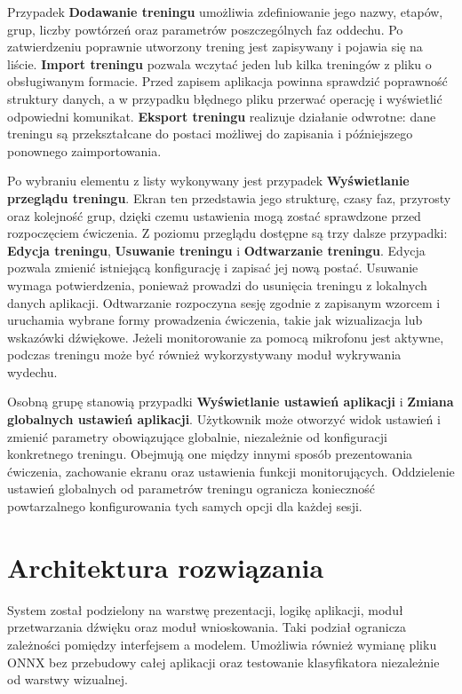 \newpage

Przypadek \textbf{Dodawanie treningu} umożliwia zdefiniowanie jego nazwy, etapów, grup, liczby powtórzeń oraz parametrów poszczególnych faz oddechu. Po zatwierdzeniu poprawnie utworzony trening jest zapisywany i pojawia się na liście. \textbf{Import treningu} pozwala wczytać jeden lub kilka treningów z pliku o obsługiwanym formacie. Przed zapisem aplikacja powinna sprawdzić poprawność struktury danych, a w przypadku błędnego pliku przerwać operację i wyświetlić odpowiedni komunikat. \textbf{Eksport treningu} realizuje działanie odwrotne: dane treningu są przekształcane do postaci możliwej do zapisania i późniejszego ponownego zaimportowania.

Po wybraniu elementu z listy wykonywany jest przypadek \textbf{Wyświetlanie przeglądu treningu}. Ekran ten przedstawia jego strukturę, czasy faz, przyrosty oraz kolejność grup, dzięki czemu ustawienia mogą zostać sprawdzone przed rozpoczęciem ćwiczenia. Z poziomu przeglądu dostępne są trzy dalsze przypadki: \textbf{Edycja treningu}, \textbf{Usuwanie treningu} i \textbf{Odtwarzanie treningu}. Edycja pozwala zmienić istniejącą konfigurację i zapisać jej nową postać. Usuwanie wymaga potwierdzenia, ponieważ prowadzi do usunięcia treningu z lokalnych danych aplikacji. Odtwarzanie rozpoczyna sesję zgodnie z zapisanym wzorcem i uruchamia wybrane formy prowadzenia ćwiczenia, takie jak wizualizacja lub wskazówki dźwiękowe. Jeżeli monitorowanie za pomocą mikrofonu jest aktywne, podczas treningu może być również wykorzystywany moduł wykrywania wydechu.

Osobną grupę stanowią przypadki \textbf{Wyświetlanie ustawień aplikacji} i \textbf{Zmiana globalnych ustawień aplikacji}. Użytkownik może otworzyć widok ustawień i zmienić parametry obowiązujące globalnie, niezależnie od konfiguracji konkretnego treningu. Obejmują one między innymi sposób prezentowania ćwiczenia, zachowanie ekranu oraz ustawienia funkcji monitorujących. Oddzielenie ustawień globalnych od parametrów treningu ogranicza konieczność powtarzalnego konfigurowania tych samych opcji dla każdej sesji.

\section{Architektura rozwiązania}

System został podzielony na warstwę prezentacji, logikę aplikacji, moduł przetwarzania dźwięku oraz moduł wnioskowania. Taki podział ogranicza zależności pomiędzy interfejsem a modelem. Umożliwia również wymianę pliku ONNX bez przebudowy całej aplikacji oraz testowanie klasyfikatora niezależnie od warstwy wizualnej.

